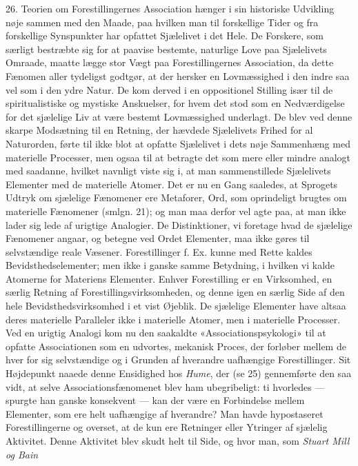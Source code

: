 \documentclass[12pt,a4paper,openany]{book}
\newcommand{\opage}[1]{\marginnote{\footnotesize\textit{[#1]}}}
\begin{document}
26. Teorien om Forestillingernes Association hænger i sin historiske Udvikling
nøje sammen med den Maade, paa hvilken man til forskellige Tider og fra
forskellige Synspunkter har opfattet Sjælelivet i det Hele. De Forskere, som
særligt bestræbte sig for at paavise bestemte, naturlige Love paa Sjælelivets
Omraade, maatte lægge stor Vægt paa Forestillingernes Association, da dette
Fænomen aller tydeligst godtgør, at der hersker en Lovmæssighed i den indre saa
vel som i den ydre Natur. De kom derved i en oppositionel Stilling især til de
spiritualistiske og mystiske Anskuelser, for hvem det stod som en Nedværdigelse
for det sjælelige Liv at være bestemt Lovmæssighed underlagt. De blev ved denne
skarpe Modsætning til en Retning, der hævdede Sjælelivets Frihed for al
Naturorden, førte til ikke blot at opfatte Sjælelivet i dets nøje Sammenhæng
med materielle Processer, men ogsaa til at betragte det som mere eller mindre
analogt med saadanne, hvilket navnligt viste sig i, at man sammenstillede
Sjælelivets Elementer med de materielle Atomer. Det er nu en Gang saaledes, at
Sprogets Udtryk om sjælelige Fænomener ere Metaforer, Ord, som oprindeligt
brugtes om materielle Fænomener (smlgn. 21); og man maa derfor vel agte paa, at
man ikke lader sig lede af urigtige Analogier. De Distinktioner, vi foretage
hvad de sjælelige Fænomener angaar, og betegne ved Ordet Elementer, maa ikke
gøres til selvstændige reale Væsener. Forestillinger f. Ex. kunne med Rette
kaldes Bevidsthedselementer; men ikke i ganske samme Betydning, i hvilken vi
kalde Atomerne for Materiens Elementer. Enhver Forestilling er en Virksomhed,
en særlig Retning af Forestillingsvirksomheden, og denne igen en særlig Side af
den hele Bevidsthedsvirksomhed i et vist Øjeblik. De sjælelige Elementer have
altsaa deres materielle Paralleler ikke i materielle Atomer, men i materielle
Processer. Ved en urigtig Analogi kom nu den saakaldte «Associationspsykologi»
til at opfatte Associationen som en udvortes, mekanisk Proces, der forløber
mellem de hver for sig selvstændige og i Grunden af hverandre uafhængige
Forestillinger. Sit Højdepunkt naaede denne Ensidighed hos \emph{Hume}, der (se
25) gennemførte den saa vidt, at selve Associationsfænomenet blev ham
ubegribeligt: ti hvorledes --- spurgte han ganske konsekvent --- kan der være
en Forbindelse mellem Elementer, som ere helt uafhængige af hverandre? Man
havde hypostaseret Forestillingerne og overset, at de kun ere Retninger eller
Ytringer af sjælelig Aktivitet. Denne Aktivitet
\setcounter{footnote}{0}%
\opage{60}blev skudt helt til Side, og hvor man, som \emph{Stuart Mill og Bain}
\end{document}
